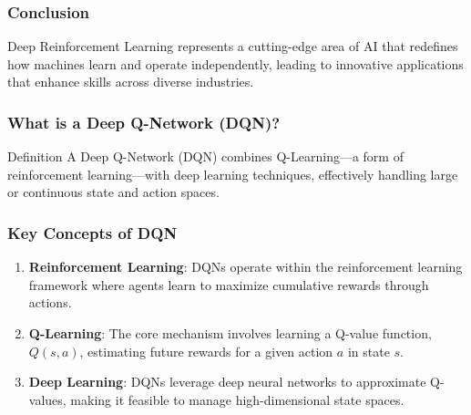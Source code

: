 \documentclass{beamer}
\begin{document}
\begin{frame}[fragile]
    \frametitle{Conclusion}
    Deep Reinforcement Learning represents a cutting-edge area of AI that redefines how machines learn and operate independently, leading to innovative applications that enhance skills across diverse industries.
\end{frame}

\begin{frame}[fragile]
    \frametitle{What is a Deep Q-Network (DQN)?}
    \begin{block}{Definition}
        A Deep Q-Network (DQN) combines Q-Learning—a form of reinforcement learning—with deep learning techniques, effectively handling large or continuous state and action spaces.
    \end{block}
\end{frame}

\begin{frame}[fragile]
    \frametitle{Key Concepts of DQN}
    \begin{enumerate}
        \item \textbf{Reinforcement Learning}:
        DQNs operate within the reinforcement learning framework where agents learn to maximize cumulative rewards through actions.
        
        \item \textbf{Q-Learning}:
        The core mechanism involves learning a Q-value function, \( Q(s, a) \), estimating future rewards for a given action \( a \) in state \( s \).
        
        \item \textbf{Deep Learning}:
        DQNs leverage deep neural networks to approximate Q-values, making it feasible to manage high-dimensional state spaces.
    \end{enumerate}
\end{frame}
\end{document}
